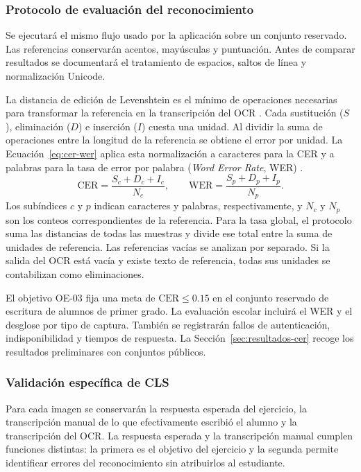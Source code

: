 \subsubsection{Protocolo de evaluación del reconocimiento}
Se ejecutará el mismo flujo usado por la aplicación sobre un conjunto reservado. Las referencias conservarán acentos, mayúsculas y puntuación. Antes de comparar resultados se documentará el tratamiento de espacios, saltos de línea y normalización Unicode.

La distancia de edición de Levenshtein es el mínimo de operaciones necesarias para transformar la referencia en la transcripción del OCR \cite{levenshtein1966binary}. Cada sustitución ($S$), eliminación ($D$) e inserción ($I$) cuesta una unidad. Al dividir la suma de operaciones entre la longitud de la referencia se obtiene el error por unidad. La Ecuación~\eqref{eq:cer-wer} aplica esta normalización a caracteres para la CER y a palabras para la tasa de error por palabra (\textit{Word Error Rate}, WER) \cite{neudecker2021ocreval,godil2017trait}.
\begin{equation}
 \mathrm{CER}=\frac{S_c+D_c+I_c}{N_c}, \qquad
 \mathrm{WER}=\frac{S_p+D_p+I_p}{N_p}.
 \label{eq:cer-wer}
\end{equation}
Los subíndices $c$ y $p$ indican caracteres y palabras, respectivamente, y $N_c$ y $N_p$ son los conteos correspondientes de la referencia. Para la tasa global, el protocolo suma las distancias de todas las muestras y divide ese total entre la suma de unidades de referencia. Las referencias vacías se analizan por separado. Si la salida del OCR está vacía y existe texto de referencia, todas sus unidades se contabilizan como eliminaciones.

El objetivo OE-03 fija una meta de $\mathrm{CER}\leq 0.15$ en el conjunto reservado de escritura de alumnos de primer grado. La evaluación escolar incluirá el WER y el desglose por tipo de captura. También se registrarán fallos de autenticación, indisponibilidad y tiempos de respuesta. La Sección~\ref{sec:resultados-cer} recoge los resultados preliminares con conjuntos públicos.

\subsubsection{Validación específica de CLS}
Para cada imagen se conservarán la respuesta esperada del ejercicio, la transcripción manual de lo que efectivamente escribió el alumno y la transcripción del OCR. La respuesta esperada y la transcripción manual cumplen funciones distintas: la primera es el objetivo del ejercicio y la segunda permite identificar errores del reconocimiento sin atribuirlos al estudiante.

